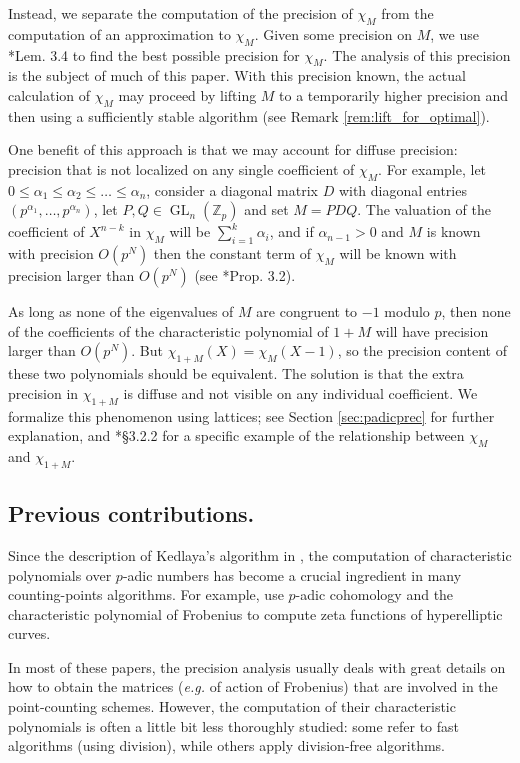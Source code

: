 \documentclass{sig-alternate-05-2015}
\DeclareMathOperator{\GL}{GL}
\newcommand{\Z}{\mathbb Z}
\newcommand{\Zp}{\Z_p}
\begin{document}
Instead, we separate the computation of the precision of $\chi_M$ from the computation
of an approximation to $\chi_M$.  Given some precision on $M$, we use \cite{caruso-roe-vaccon:14a}*{Lem. 3.4}
to find the best possible precision for $\chi_M$.  The analysis of this precision is the subject
of much of this paper.  With this precision known, the actual calculation of $\chi_M$
may proceed by lifting $M$ to a temporarily higher precision and then using a sufficiently
stable algorithm (see Remark \ref{rem:lift_for_optimal}).

One benefit of this approach is that we may account for diffuse precision:
precision that is not localized on any single coefficient of $\chi_M$.  For example,
let $0 \le \alpha_1 \le \alpha_2 \le \dots \le \alpha_n$, consider a
diagonal matrix $D$ with diagonal entries $(p^{\alpha_1}, \dots, p^{\alpha_n})$,
let $P, Q \in \GL_n(\Zp)$ and set $M = PDQ$.  The valuation of the coefficient
of $X^{n-k}$ in $\chi_M$ will be $\sum_{i=1}^k \alpha_i$, and if $\alpha_{n-1} > 0$
and $M$ is known with precision $O(p^N)$ then the constant term of $\chi_M$
will be known with precision larger than $O(p^N)$ (see
\cite{caruso-roe-vaccon:15a}*{Prop. 3.2}).

As long as none of the eigenvalues of $M$ are congruent to $-1$ modulo $p$,
then none of the coefficients of the characteristic polynomial of $1+M$ will have
precision larger than $O(p^N)$.  But $\chi_{1+M}(X) = \chi_M(X-1)$, so the precision
content of these two polynomials should be equivalent. The solution is that the
extra precision in $\chi_{1+M}$ is diffuse and not visible on any individual coefficient.
We formalize this phenomenon using lattices; see Section \ref{sec:padicprec} for
further explanation, and \cite{caruso:17a}*{\S 3.2.2} for a specific example of the
relationship between $\chi_M$ and $\chi_{1+M}$.

\subsection*{Previous contributions.}

Since the description of Kedlaya's algorithm in
\cite{kedlaya:01a}, the computation of characteristic polynomials
over $p$-adic numbers
has become a crucial ingredient in many counting-points algorithms.
For example, \cite{harvey:07a, harvey:14a} use $p$-adic cohomology
and the characteristic polynomial of Frobenius to compute zeta functions
of hyperelliptic curves.

In most of these papers, the precision analysis usually
deals with great details on how to obtain the matrices (\textit{e.g.} of action of Frobenius)
that are involved in the point-counting schemes.
However, the computation of their characteristic polynomials is often
a little bit less thoroughly studied: some
refer to fast algorithms (using division), while others
apply division-free algorithms.
\end{document}
